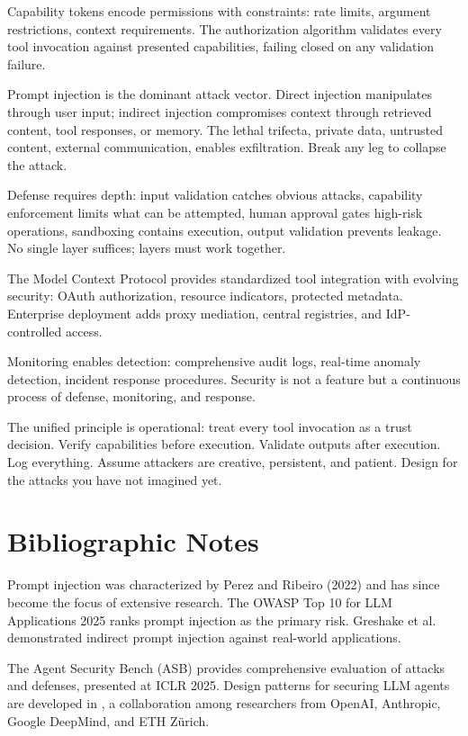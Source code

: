 Capability tokens encode permissions with constraints: rate limits, argument restrictions, context requirements. The authorization algorithm validates every tool invocation against presented capabilities, failing closed on any validation failure.

Prompt injection is the dominant attack vector. Direct injection manipulates through user input; indirect injection compromises context through retrieved content, tool responses, or memory. The lethal trifecta, private data, untrusted content, external communication, enables exfiltration. Break any leg to collapse the attack.

Defense requires depth: input validation catches obvious attacks, capability enforcement limits what can be attempted, human approval gates high-risk operations, sandboxing contains execution, output validation prevents leakage. No single layer suffices; layers must work together.

The Model Context Protocol provides standardized tool integration with evolving security: OAuth authorization, resource indicators, protected metadata. Enterprise deployment adds proxy mediation, central registries, and IdP-controlled access.

Monitoring enables detection: comprehensive audit logs, real-time anomaly detection, incident response procedures. Security is not a feature but a continuous process of defense, monitoring, and response.

The unified principle is operational: treat every tool invocation as a trust decision. Verify capabilities before execution. Validate outputs after execution. Log everything. Assume attackers are creative, persistent, and patient. Design for the attacks you have not imagined yet.

\section*{Bibliographic Notes}

Prompt injection was characterized by Perez and Ribeiro (2022) and has since become the focus of extensive research. The OWASP Top 10 for LLM Applications 2025 \cite{owasp2025} ranks prompt injection as the primary risk. Greshake et al. \cite{greshake2023} demonstrated indirect prompt injection against real-world applications.

The Agent Security Bench (ASB) \cite{asb2025} provides comprehensive evaluation of attacks and defenses, presented at ICLR 2025. Design patterns for securing LLM agents are developed in \cite{designpatterns2025}, a collaboration among researchers from OpenAI, Anthropic, Google DeepMind, and ETH Zürich.

